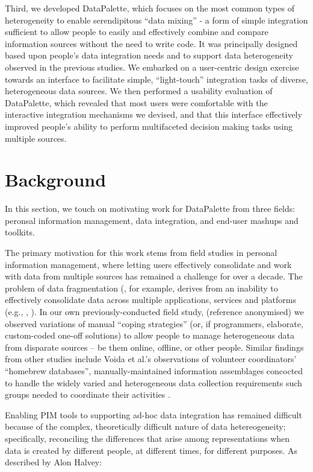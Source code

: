\documentclass{sigchi}
\begin{document}
Third, we developed DataPalette, which focuses on the most common types of heterogeneity to enable serendipitous ``data mixing'' - a form of simple integration sufficient to allow people to easily and effectively combine and compare information sources without the need to write code.  It was principally designed based upon people's data integration needs and to support data heterogeneity observed in the previous studies.  We embarked on a user-centric design exercise towards an interface to facilitate simple, ``light-touch'' integration tasks of diverse, heterogeneous data sources.  We then performed a usability evaluation of DataPalette, which revealed that most users were comfortable with the interactive integration mechanisms we devised, and that this interface effectively improved people's ability to perform multifaceted decision making tasks using multiple sources.

\section{Background}

In this section, we touch on motivating work for DataPalette from three fields: peronsal information management, data integration, and end-user mashups and toolkits.

The primary motivation for this work stems from field studies in personal information management, where letting users effectively consolidate and work with data from multiple sources has remained a challenge for over a decade. The problem of data fragmentation (\cite{Jones05towardsa}, for example, derives from an inability to effectively consolidate data across multiple applications, services and platforms (e.g., \cite{bergman}, \cite{boardmansasse}). In our own previously-conducted field study, (reference anonymised) we observed variations of manual ``coping strategies'' (or, if programmers, elaborate, custom-coded one-off solutions) to allow people to manage heterogeneous data from disparate sources -- be them online, offline, or other people.  Similar findings from other studies include Voida et al.'s observations of volunteer coordinators' ``homebrew databases'', manually-maintained information assemblages concocted to handle the widely varied and heterogeneous data collection requirements such groups needed to coordinate their activities \cite{Voida:2011:HDC:1978942.1979078}.

Enabling PIM tools to supporting ad-hoc data integration has remained difficult because of the complex, theoretically difficult nature of data hetereogeneity; specifically, reconciling the differences that arise among representations when data is created by different people, at different times, for different purposes. As described by Alon Halvey:
\end{document}
